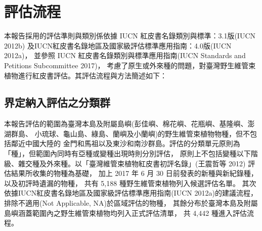 \chapter{評估流程}

\begin{multicols}{2}
本報告採用的評估準則與類別係依據 IUCN 紅皮書名錄類別與標準：3.1版(IUCN 2012b)
及IUCN紅皮書名錄地區及國家級評估標準應用指南：4.0版(IUCN 2012a)，
並參照 IUCN 紅皮書名錄類別與標準應用指南(IUCN Standards and Petitions Subcommittee 2017)，
考慮了原生或外來種的問題，對臺灣野生維管束植物進行紅皮書評估。其評估流程與方法簡述如下：
\end{multicols}
\section{界定納入評估之分類群}
\begin{multicols}{2}
本報告評估的範圍為臺灣本島及附屬島嶼(彭佳嶼、棉花嶼、花瓶嶼、基隆嶼、澎湖群島、
小琉球、龜山島、綠島、蘭嶼及小蘭嶼)的野生維管束植物物種，但不包括鄰近中國大陸的
金門和馬祖以及東沙和南沙群島。評估的分類單元原則為「種」，但範圍內同時有亞種或變種出現時則分別評估，
原則上不包括變種以下階級、雜交種及外來種。以「臺灣維管束植物紅皮書初評名錄」(王震哲等 2012)
評估結果所收集的物種為基礎，
加上 2017 年 6 月 30 日前發表的新種與新紀錄種，以及初評時遺漏的物種，
共有 5,188 種野生維管束植物列入候選評估名單。
其次依據IUCN紅皮書名錄地區及國家級評估標準應用指南(IUCN 2012a)的建議流程，
排除不適用(Not Applicable, NA)於區域評估的物種，
其餘分布於臺灣本島及附屬島嶼涵蓋範圍內之野生維管束植物均列入正式評估清單，
共 4,442 種進入評估流程。 \\
\end{multicols}

